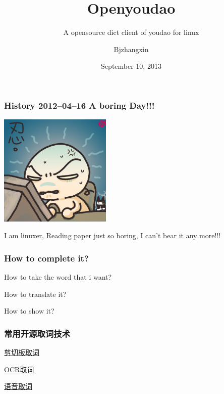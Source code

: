 \documentclass[10pt]{beamer}
\subtitle{A opensource dict client of youdao for linux}
\author[NetEase]{Bjzhangxin}
\title{Openyoudao}
\date{September 10, 2013}
\begin{document}
\begin{CJK*}{UTF8}{song} %
\begin{frame}[plain]
  \titlepage
\end{frame}

\begin{frame}
  \frametitle{\Large{History 2012--04--16 A boring Day!!!}}

\begin{center} 
  \includegraphics[width=0.4\textwidth]{pic1.jpg}
\end{center}
\medskip
\quad
\qquad

I am linuxer, Reading paper just so boring, I can't bear it any more!!!
\end{frame}
\begin{frame}
  \frametitle{\Large{How to complete it?}}
\begin{itemize}
 \LARGE{\item How to take the word that i want?
  \item How to translate it?
  \item How to show it?}
\end{itemize}
\end{frame}
\begin{frame}
  \frametitle{\Large{常用开源取词技术}}
\LARGE\begin{itemize}
 {\item \href{http://nullege.com/codes/show/src@p@y@python-xlib-HEAD@trunk@examples@record_demo.py/86/Xlib.display.Display.record_create_context}{剪切板取词}
  \item \href{https://code.google.com/p/tesseract-ocr/}{OCR取词}
  \item \href{http://www.athoughtabroad.com/2013/05/22/using-google-s-speech-recognition-web-service-with-python}{语音取词}}
\end{itemize}
\end{frame}


\end{CJK*}
\end{document}
